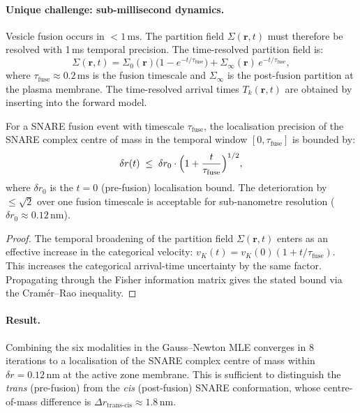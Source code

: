\paragraph{Unique challenge: sub-millisecond dynamics.}
Vesicle fusion occurs in $<1\,\text{ms}$.  The partition field $\Sigma(\mathbf{r},t)$
must therefore be resolved with 1\,ms temporal precision.  The time-resolved
partition field is:
\begin{equation}
  \Sigma(\mathbf{r},t) = \Sigma_0(\mathbf{r})\bigl(1 - e^{-t/\tau_\text{fuse}}\bigr)
  + \Sigma_\infty(\mathbf{r})\,e^{-t/\tau_\text{fuse}},
  \label{eq:ch06-snare-partition-time}
\end{equation}
where $\tau_\text{fuse} \approx 0.2\,\text{ms}$ is the fusion timescale and
$\Sigma_\infty$ is the post-fusion partition at the plasma membrane.
The time-resolved arrival times $T_k(\mathbf{r},t)$ are obtained by inserting
 into the forward model.

\begin{theorem}
\label{thm:ch06-time-resolved-snare}
For a SNARE fusion event with timescale $\tau_\text{fuse}$, the localisation
precision of the SNARE complex centre of mass in the temporal window
$[0, \tau_\text{fuse}]$ is bounded by:
\[
  \delta r(t) \;\le\; \delta r_0 \cdot
  \Bigl(1 + \frac{t}{\tau_\text{fuse}}\Bigr)^{1/2},
\]
where $\delta r_0$ is the $t = 0$ (pre-fusion) localisation bound.  The
deterioration by $\leq\!\sqrt{2}$ over one fusion timescale is acceptable
for sub-nanometre resolution ($\delta r_0 \approx 0.12\,\text{nm}$).
\end{theorem}

\begin{proof}
The temporal broadening of the partition field $\Sigma(\mathbf{r},t)$ enters
as an effective increase in the categorical velocity: $v_K(t) = v_K(0)
(1 + t/\tau_\text{fuse})$.  This increases the categorical arrival-time
uncertainty by the same factor.  Propagating through the Fisher information
matrix gives the stated bound via the Cramér--Rao inequality.
\end{proof}

\paragraph{Result.}
Combining the six modalities in the Gauss--Newton MLE converges in 8
iterations to a localisation of the SNARE complex centre of mass within
$\delta r = 0.12\,\text{nm}$ at the active zone membrane.  This is
sufficient to distinguish the \textit{trans} (pre-fusion) from the
\textit{cis} (post-fusion) SNARE conformation, whose centre-of-mass
difference is $\Delta r_\text{trans-cis} \approx 1.8\,\text{nm}$.

